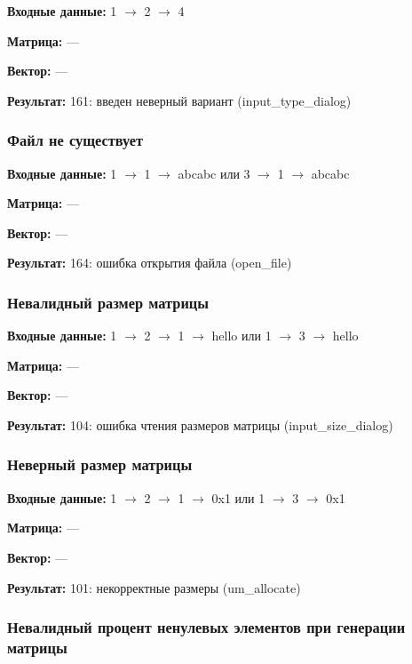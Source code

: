 \documentclass[a4paper,12pt]{extarticle}
\begin{document}
\textbf{Входные данные: }
1 $\rightarrow$ 2 $\rightarrow$ 4

\textbf{Матрица: }
---

\textbf{Вектор: }
---

\textbf{Результат: }
161: введен неверный вариант (input\_type\_dialog)

\subsubsection{Файл не существует}



\textbf{Входные данные: }
1 $\rightarrow$ 1 $\rightarrow$ abcabc или 3 $\rightarrow$ 1 $\rightarrow$ abcabc

\textbf{Матрица: }
---

\textbf{Вектор: }
---

\textbf{Результат: }
164: ошибка открытия файла (open\_file)

\subsubsection{Невалидный размер матрицы}



\textbf{Входные данные: }
1 $\rightarrow$ 2 $\rightarrow$ 1 $\rightarrow$ hello или 1 $\rightarrow$ 3 $\rightarrow$ hello

\textbf{Матрица: }
---

\textbf{Вектор: }
---

\textbf{Результат: }
104: ошибка чтения размеров матрицы (input\_size\_dialog)

\subsubsection{Неверный размер матрицы}



\textbf{Входные данные: }
1 $\rightarrow$ 2 $\rightarrow$ 1 $\rightarrow$ 0x1 или 1 $\rightarrow$ 3 $\rightarrow$ 0x1

\textbf{Матрица: }
---

\textbf{Вектор: }
---

\textbf{Результат: }
101: некорректные размеры (um\_allocate)

\subsubsection{Невалидный процент ненулевых элементов при генерации матрицы}
\end{document}
